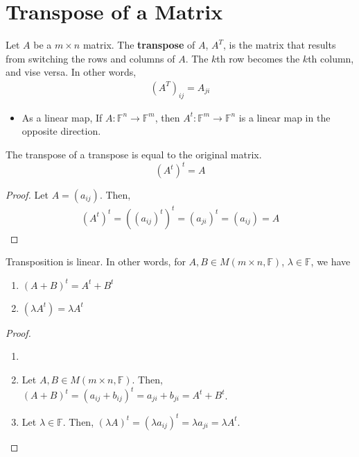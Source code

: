 \documentclass[letterpaper,12pt]{article}
\begin{document}
\section*{Transpose of a Matrix}
\begin{definition}
Let $A$ be a $m \times n$ matrix. The \textbf{transpose} of $A$, $A^T$, is the matrix that results from switching the rows and columns of $A$. The $k$th row becomes the $k$th column, and vise versa. In other words,
\begin{align*}
    (A^T)_{ij} = A_{ji}
\end{align*}
\begin{itemize}
    \item As a linear map, If $A: \mathbb{F}^n \rightarrow \mathbb{F}^m$, then $A^t: \mathbb{F}^m \rightarrow \mathbb{F}^n$ is a linear map in the opposite direction.
\end{itemize}
\end{definition}

\begin{theorem}
The transpose of a transpose is equal to the original matrix.
\begin{equation*}
(A^t)^t = A
\end{equation*}
\end{theorem}
\begin{proof}
Let $A = (a_{ij})$. Then,
\begin{align*}
    (A^t)^t = ((a_{ij})^t)^t = (a_{ji})^t = (a_{ij}) = A
\end{align*}

\end{proof}

\begin{theorem} Transposition is linear. In other words, for $A, B \in M(m \times n, \mathbb{F})$, $\lambda \in \mathbb{F}$, we have
\begin{enumerate}
    \item $(A + B)^t = A^t + B^t$
    \item $(\lambda A^t) = \lambda A^t$
\end{enumerate}
\end{theorem}
\begin{proof}
\begin{enumerate}
    \item[]
    \item Let $A, B \in M(m \times n, \mathbb{F})$. Then, $(A + B)^t = (a_{ij} + b_{ij})^t = a_{ji} + b_{ji} = A^t + B^t$.
    \item Let $\lambda \in \mathbb{F}$. Then, $(\lambda A)^t = (\lambda a_{ij})^t = \lambda a_{ji} = \lambda A^t$.
\end{enumerate}
\end{proof}
\end{document}
